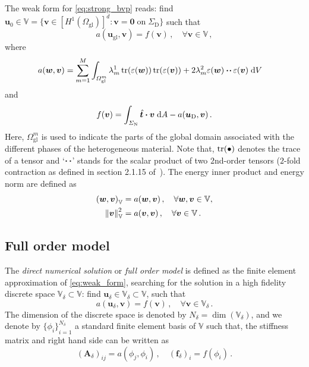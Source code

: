 \documentclass[AMA,STIX1COL,doublespace]{WileyNJD-v2}
\begin{document}
The weak form for \cref{eq:strong_bvp} reads: find $\bm{u}_{0}\in\mathbb{V}=\{\bm{v}\in{[H^1(\varOmega_{\mathrm{gl}})]}^d: \bm{v}=\bm{0}\;\mathrm{on}\;\Sigma_{\mathrm{D}}\}$ such that
\begin{equation}
	\label{eq:weak_form}
	a(\bm{u}_{\mathrm{gl}}, \bm{v}) = f(\bm{v})\,, \quad \forall \bm{v} \in \mathbb{V}\,,
\end{equation}
where
\begin{align}
	a(\bm{w}, \bm{v}) &= \sum_{m=1}^M \int_{\varOmega_{\mathrm{gl}}^m} 
    \lambda^1_m \tr(\varepsilon(\bm{w})) \tr(\varepsilon(\bm{v})) + 
    2\lambda^2_m \varepsilon(\bm{w}) \vdot\!\vdot\, \varepsilon(\bm{v}) \; \dd V
\end{align}
and
\begin{equation}
	f(\bm{v}) = \int_{\varSigma_{\mathrm{N}}} \hat{\bm{t}} \vdot \bm{v}\; \dd A - a(\bm{u}_{\mathrm{D}}, \bm{v})\,.
\end{equation}
Here, $\varOmega_{\mathrm{gl}}^m$ is used to indicate the parts of the global domain associated with the different phases of the heterogeneous material.
Note that, $\tr(\bullet)$ denotes the trace of a tensor and `$\vdot\,\vdot$' stands for the scalar product of two $2$nd-order tensors ($2$-fold contraction as defined in section 2.1.15 of~\cite{BertramGluege2015}).
The energy inner product and energy norm are defined as
\begin{align}
	{\left(\bm{w}, \bm{v}\right)}_{\mathbb{V}} &= a(\bm{w}, \bm{v})\,,\quad \forall \bm{w}, \bm{v} \in\mathbb{V},\\
	\norm{\bm{v}}_{\mathbb{V}}^2 &= a(\bm{v}, \bm{v})\,,\quad \forall \bm{v} \in\mathbb{V}\,.
\end{align}
\subsection{Full order model}%
\label{sub:full_order_model}

The \textit{direct numerical solution} or \textit{full order model} is defined as the finite element approximation of
\cref{eq:weak_form}, searching for the solution in a high fidelity discrete space $\mathbb{V}_{{\delta}}\subset\mathbb{V}$:
find $\bm{u}_{{\delta}} \in \mathbb{V}_{{\delta}}\subset\mathbb{V}$, such that
\begin{equation}
	a({\bm{u}_{{\delta}}}, \bm{v}) = f(\bm{v})\,,\quad \forall \bm{v} \in \mathbb{V}_{{\delta}}\,.
\end{equation}
The dimension of the discrete space is denoted by $N_{\delta} = \dim(\mathbb{V}_{\delta})$, and we denote by ${\{\phi_i\}}_{i=1}^{N_{\delta}}$ a standard finite element basis of $\mathbb{V}$ such that, the stiffness matrix and right hand side can be written as
\begin{equation}
	{(\bm{A}_{\delta})}_{ij} = a(\phi_j, \phi_i)\,,\quad {(\bm{f}_{\delta})}_i = f(\phi_i)\,.
\end{equation}
\end{document}
